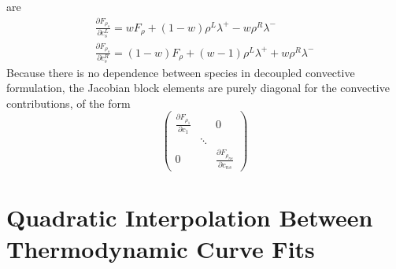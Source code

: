 are
\begin{gather} \frac{\partial F_{\rho_s}}{\partial c^L_s} =
  wF_\rho+(1-w)\rho^L\lambda^+ - w\rho^R\lambda^- \\ \frac{\partial
    F_{\rho_s}}{\partial c^R_s} = (1-w)F_\rho+(w-1)\rho^L\lambda^+ +
    w\rho^R\lambda^- \end{gather}
Because there is no dependence between species in decoupled convective
formulation, the Jacobian block elements are purely diagonal for the convective
contributions, of the form
\begin{equation} \begin{pmatrix} \frac{\partial F_{\rho_1}}{\partial c_1} & & 0
    \\ & \ddots &  \\ 0 & & \frac{\partial F_{\rho_{ns}}}{\partial c_{ns}}
  \end{pmatrix} \end{equation}

\section{Quadratic Interpolation Between Thermodynamic Curve Fits}

